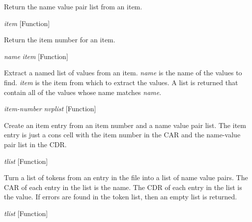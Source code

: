\begin{doc-string}
Return the name value pair list from an item.
\end{doc-string}

\vspace{1em}
\noindent
{}
\usebox{\funcname}\emph{item}
 \hfill [Function]

\begin{doc-string}
Return the item number for an item.
\end{doc-string}

\vspace{1em}
\noindent
{}
\usebox{\funcname}\emph{name} \emph{item}
 \hfill [Function]

\begin{doc-string}
Extract a named list of values from an item.  \emph{name} is the name of the values to
find.  \emph{item} is the item from which to extract the values.  A list is returned that contain
all of the values whose name matches \emph{name}.
\end{doc-string}

\vspace{1em}
\noindent
{}
\usebox{\funcname}\emph{item-number} \emph{nvplist}
 \hfill [Function]

\begin{doc-string}
Create an item entry from an item number and a name value pair list.
The item entry is just a cons cell with the item number in the CAR and the
name-value pair list in the CDR.
\end{doc-string}

\vspace{1em}
\noindent
{}
\usebox{\funcname}\emph{tlist}
 \hfill [Function]

\begin{doc-string}
Turn a list of tokens from an entry in the file into a list of name value pairs.  The
CAR of each entry in the list is the name.  The CDR of each entry in the list is the value.  If
errors are found in the token list, then an empty list is returned.
\end{doc-string}

\vspace{1em}
\noindent
{}
\usebox{\funcname}\emph{tlist}
 \hfill [Function]

